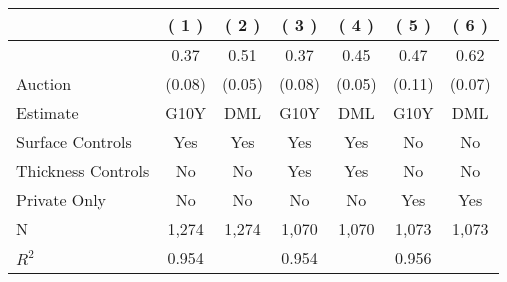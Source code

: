 
\begin{tabular}{lcccccc}
\toprule
 & ( 1 ) & ( 2 ) & ( 3 ) & ( 4 ) & ( 5 ) & ( 6 )\\
\midrule
 & 0.37 & 0.51 & 0.37 & 0.45 & 0.47 & 0.62\\

\multirow{-2}{*}{\raggedright\arraybackslash Auction} & (0.08) & (0.05) & (0.08) & (0.05) & (0.11) & (0.07)\\

\midrule
Estimate & G10Y & DML & G10Y & DML & G10Y & DML\\

Surface Controls & Yes & Yes & Yes & Yes & No & No\\

Thickness Controls & No & No & Yes & Yes & No & No\\

Private Only & No & No & No & No & Yes & Yes\\

N & 1,274 & 1,274 & 1,070 & 1,070 & 1,073 & 1,073\\

$R^2$ & 0.954 &  & 0.954 &  & 0.956 & \\
\bottomrule
\end{tabular}
